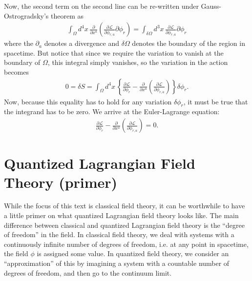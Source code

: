 \documentclass{book}
\numberwithin{equation}{section}
\theoremstyle{definition}
\newcommand{\p}{\partial}
\newcommand{\lag}{\mathcal{L}}
\begin{document}
Now, the second term on the second line can be re-written under Gauss-Ostrogradsky's theorem as
\begin{align}
\int_\Omega d^4x\,\frac{\p}{\p x^a}\left(\frac{\p\lag}{\p\phi_{r,a}}\p \phi_r \right) = 
\int_{\delta \Omega}d^3x\,  \frac{\p\lag}{\p\phi_{r,a}}\p \phi_r
\end{align}
where the $\p_a$ denotes a divergence and $\delta \Omega$ denotes the boundary of the region in spacetime. But notice that since we require the variation to vanish at the boundary of $\Omega$, this integral simply vanishes, so the variation in the action becomes
\begin{align}
0 = \delta S = \int_\Omega d^4x\, \left\{ \frac{\p\lag}{\p\phi_r} - \frac{\p}{\p x^a}\left( \frac{\p\lag}{\p\phi_{r,a}} \right) \right\}\delta \phi_r.
\end{align}
Now, because this equality has to hold for any variation $\delta \phi_r$, it must be true that the integrand has to be zero. We arrive at the Euler-Lagrange equation:
\begin{align}
\frac{\p\lag}{\p\phi_r} - \frac{\p}{\p x^a}\left( \frac{\p\lag}{\p\phi_{r,a}} \right) = 0.
\end{align}

\section{Quantized Lagrangian Field Theory (primer)}
While the focus of this text is classical field theory, it can be worthwhile to have a little primer on what quantized Lagrangian field theory looks like. The main difference between classical and quantized Lagrangian field theory is the ``degree of freedom'' in the field. In classical field theory, we deal with systems with a continuously infinite number of degrees of freedom, i.e. at any point in spacetime, the field $\phi$ is assigned some value. In quantized field theory, we consider an ``approximation'' of this by imagining a system with a countable number of degrees of freedom, and then go to the continuum limit.\\
\end{document}
